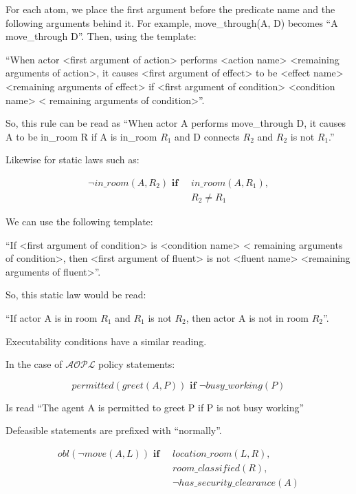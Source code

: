 For each atom, we place the first argument before the predicate name and the following arguments behind it.
For example, move\_through(A, D) becomes ``A move\_through D''.
Then, using the template:

``When actor <first argument of action> performs <action name> <remaining arguments of action>, it causes <first argument of effect> to be <effect name> <remaining arguments of effect> if <first argument of condition> <condition name> < remaining arguments of condition>''.

So, this rule can be read as ``When actor A performs move\_through D, it causes A to be in\_room R if A is in\_room $R_{1}$ and D connects $R_{2}$ and $R_{2}$ is not $R_{1}$.''

Likewise for static laws such as:

\begin{equation}
\begin{split}
    \neg in\_room(A, R_{2}) \textbf{ if } \
        & in\_room(A, R_{1}), \\
        & R_{2} \neq R_{1}
\end{split}
\end{equation}

We can use the following template:

``If <first argument of condition> is <condition name> < remaining arguments of condition>, then <first argument of fluent> is not <fluent name> <remaining arguments of fluent>''.

So, this static law would be read:

``If actor A is in room $R_{1}$ and $R_{1}$ is not $R_{2}$, then actor A is not in room $R_{2}$''.

Executability conditions have a similar reading.

In the case of $\mathcal{AOPL}$ policy statements:

\begin{equation}
    permitted(greet(A, P)) \textbf{ if }
        \neg busy\_working(P)
\end{equation}

Is read ``The agent A is permitted to greet P if P is not busy working''

Defeasible statements are prefixed with ``normally''.

\begin{equation}
\begin{split}
    obl(\neg move(A, L)) \textbf{ if } \
        & location\_room(L, R), \\
        & room\_classified(R), \\
        & \neg has\_security\_clearance(A)
\end{split}
\end{equation}

